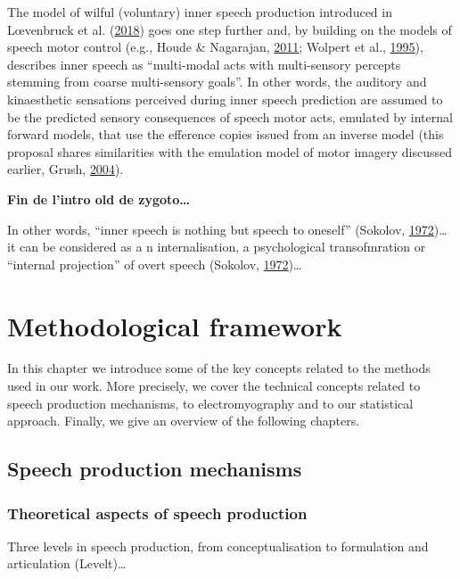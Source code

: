 \documentclass[a4paper,12pt,twoside,openright,oldfontcommands]{memoir}
\begin{document}
The model of wilful (voluntary) inner speech production introduced in
Lœvenbruck et al.
(\protect\hyperlink{ref-loevenbruck_cognitive_2018}{2018}) goes one step
further and, by building on the models of speech motor control (e.g.,
Houde \& Nagarajan, \protect\hyperlink{ref-houde_speech_2011}{2011};
Wolpert et al., \protect\hyperlink{ref-wolpert_internal_1995}{1995}),
describes inner speech as ``multi-modal acts with multi-sensory percepts
stemming from coarse multi-sensory goals''. In other words, the auditory
and kinaesthetic sensations perceived during inner speech prediction are
assumed to be the predicted sensory consequences of speech motor acts,
emulated by internal forward models, that use the efference copies
issued from an inverse model (this proposal shares similarities with the
emulation model of motor imagery discussed earlier, Grush,
\protect\hyperlink{ref-grush_emulation_2004}{2004}).

\textbf{Fin de l'intro old de zygoto\ldots{}}

In other words, ``inner speech is nothing but speech to oneself''
(Sokolov, \protect\hyperlink{ref-sokolov_inner_1972}{1972})\ldots{} it
can be considered as a n internalisation, a psychological transofmration
or ``internal projection'' of overt speech (Sokolov,
\protect\hyperlink{ref-sokolov_inner_1972}{1972})\ldots{}

\chapter{Methodological framework}\label{methodological-framework}

In this chapter we introduce some of the key concepts related to the
methods used in our work. More precisely, we cover the technical
concepts related to speech production mechanisms, to electromyography
and to our statistical approach. Finally, we give an overview of the
following chapters.

\section{Speech production
mechanisms}\label{speech-production-mechanisms}

\subsection{Theoretical aspects of speech
production}\label{theoretical-aspects-of-speech-production}

Three levels in speech production, from conceptualisation to formulation
and articulation (Levelt)\ldots{}
\end{document}
